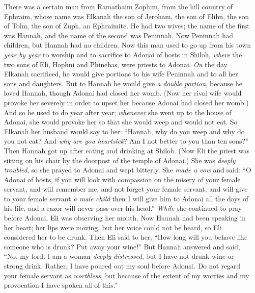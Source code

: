 
\begin{biblechapter} %
 There was a certain man from Ramathaim Zophim, from the hill country of Ephraim, whose name was Elkanah the son of Jeroham, the son of Elihu, the son of Tohu, the son of Zuph, an Ephraimite.
\verse He had two wives; the name of the first was Hannah, and the name of the second was Peninnah. Now Peninnah had children, but Hannah had no children.
\verse Now this man used to go up from his town \textit{year by year} to worship and to sacrifice to Adonai of hosts in Shiloh, \textit{where} the two sons of Eli, Hophni and Phinehas, were priests to Adonai.
\verse \textit{On} the day Elkanah sacrificed, he would give portions to his wife Peninnah and to all her sons and daughters.
\verse But to Hannah he would give \textit{a double portion}, because he loved Hannah, though Adonai had closed her womb.
\verse (Now her rival wife would provoke her severely in order to upset her because Adonai had closed her womb.)
\verse And so he used to do year after year; \textit{whenever} she went up to the house of Adonai, she would provoke her so that she would weep and would not eat.
\verse So Elkanah her husband would say to her: “Hannah, why do you weep and why do you not eat? And \textit{why are you heartsick}? Am I not better to you than ten sons?”
\verse Then Hannah got up after eating and drinking at Shiloh. (Now Eli the priest was sitting on his chair by the doorpost of the temple of Adonai.)
\verse She was \textit{deeply troubled}, so she prayed to Adonai and wept bitterly.
\verse She \textit{made a vow} and said: “O Adonai of hosts, if you will look with compassion on the misery of your female servant, and will remember me, and not forget your female servant, and will give to your female servant \textit{a male child} then I will give him to Adonai all the days of his life, and a razor will never pass over his head.”
\verse \textit{While} she continued to pray before Adonai, Eli was observing her mouth.
\verse Now Hannah had been speaking in her heart; her lips were moving, but her voice could not be heard, so Eli considered her to be drunk.
\verse Then Eli said to her, “How long will you behave like someone who is drunk? Put away your wine!”
\verse But Hannah answered and said, “No, my lord. I am a woman \textit{deeply distressed}, but I have not drunk wine or strong drink. Rather, I have poured out my soul before Adonai.
\verse Do not regard your female servant as \textit{worthless}, but because of the extent of my worries and my provocation I have spoken all of this.”

\end{biblechapter}
